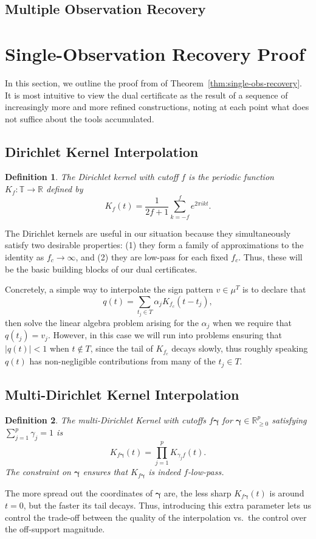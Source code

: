 \documentclass[11pt]{article}
\newcommand{\RR}{\mathbb{R}}
\newcommand{\TT}{\mathbb{T}}
\newtheorem{definition}{Definition}
\begin{document}
\subsection{Multiple Observation Recovery}

\section{Single-Observation Recovery Proof}

In this section, we outline the proof from \cite{fernandez2016super} of Theorem~\ref{thm:single-obs-recovery}.
It is most intuitive to view the dual certificate as the result of a sequence of increasingly more and more refined constructions, noting at each point what does not suffice about the tools accumulated.

\subsection{Dirichlet Kernel Interpolation}

\begin{definition}
    The \emph{Dirichlet kernel with cutoff $f$} is the periodic function $K_f: \TT \to \RR$ defined by
    \[ K_f(t) = \frac{1}{2f + 1} \sum_{k = -f}^f e^{2\pi i k t}. \]
\end{definition}
The Dirichlet kernels are useful in our situation because they simultaneously satisfy two desirable properties: (1) they form a family of approximations to the identity as $f_c \to \infty$, and (2) they are low-pass for each fixed $f_c$.
Thus, these will be the basic building blocks of our dual certificates.

Concretely, a simple way to interpolate the sign pattern $v \in \mu^T$ is to declare that
\[ q(t) = \sum_{t_j \in T} \alpha_j K_{f_c}(t - t_j), \]
then solve the linear algebra problem arising for the $\alpha_j$ when we require that $q(t_j) = v_j$.
However, in this case we will run into problems ensuring that $|q(t)| < 1$ when $t \notin T$, since the tail of $K_{f_c}$ decays slowly, thus roughly speaking $q(t)$ has non-negligible contributions from many of the $t_j \in T$.
  
\subsection{Multi-Dirichlet Kernel Interpolation}

\begin{definition}
    The \emph{multi-Dirichlet Kernel with cutoffs $f\bm \gamma$} for $\bm\gamma \in \RR^p_{\geq 0}$ satisfying $\sum_{j = 1}^p \gamma_j = 1$ is
    \[ K_{f\bm\gamma}(t) = \prod_{j = 1}^p K_{\gamma_j f}(t). \]
    The constraint on $\bm \gamma$ ensures that $K_{f\bm\gamma}$ is indeed $f$-low-pass.
\end{definition}
The more spread out the coordinates of $\bm\gamma$ are, the less sharp $K_{f\bm\gamma}(t)$ is around $t = 0$, but the faster its tail decays.
Thus, introducing this extra parameter lets us control the trade-off between the quality of the interpolation vs.\ the control over the off-support magnitude.
\end{document}
